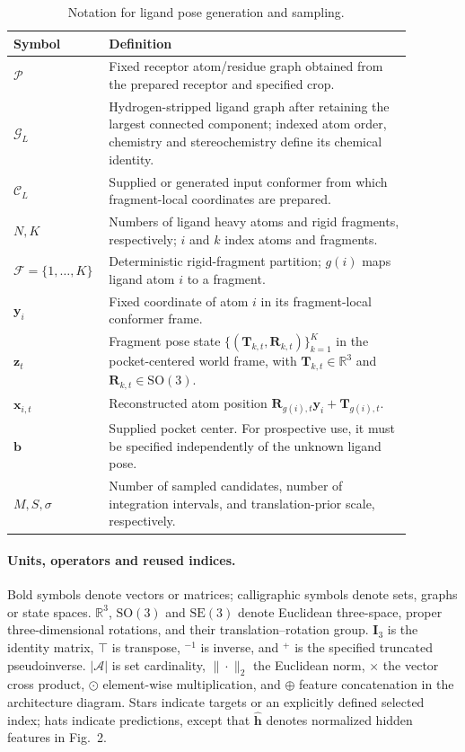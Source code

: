\documentclass{article}
\newcommand{\R}{\mathbb{R}}
\newcommand{\SO}{\mathrm{SO}}
\newcommand{\SE}{\mathrm{SE}}
\begin{document}
\begin{table}[htbp]
    \centering
    \small
    \caption{Notation for ligand pose generation and sampling.}
    \label{tab:si_notation}
    \begin{tabular}{p{0.16\linewidth}p{0.72\linewidth}}
        \toprule
        Symbol & Definition \\
        \midrule
        $\mathcal{P}$ & Fixed receptor atom/residue graph obtained from the prepared receptor and specified crop. \\
        $\mathcal{G}_{L}$ & Hydrogen-stripped ligand graph after retaining the largest connected component; indexed atom order, chemistry and stereochemistry define its chemical identity. \\
        $\mathcal{C}_{L}$ & Supplied or generated input conformer from which fragment-local coordinates are prepared. \\
        $N,K$ & Numbers of ligand heavy atoms and rigid fragments, respectively; $i$ and $k$ index atoms and fragments. \\
        $\mathcal{F}=\{1,\ldots,K\}$ & Deterministic rigid-fragment partition; $g(i)$ maps ligand atom $i$ to a fragment. \\
        $\mathbf{y}_i$ & Fixed coordinate of atom $i$ in its fragment-local conformer frame. \\
        $\mathbf{z}_t$ & Fragment pose state $\{(\mathbf{T}_{k,t},\mathbf{R}_{k,t})\}_{k=1}^{K}$ in the pocket-centered world frame, with $\mathbf{T}_{k,t}\in\R^3$ and $\mathbf{R}_{k,t}\in\SO(3)$. \\
        $\mathbf{x}_{i,t}$ & Reconstructed atom position $\mathbf{R}_{g(i),t}\mathbf{y}_i+\mathbf{T}_{g(i),t}$. \\
        $\mathbf{b}$ & Supplied pocket center. For prospective use, it must be specified independently of the unknown ligand pose. \\
        $M,S,\sigma$ & Number of sampled candidates, number of integration intervals, and translation-prior scale, respectively. \\
        \bottomrule
    \end{tabular}
\end{table}

\paragraph{Units, operators and reused indices.}
Bold symbols denote vectors or matrices; calligraphic symbols denote sets, graphs or state spaces. \(\R^3\), \(\SO(3)\) and \(\SE(3)\) denote Euclidean three-space, proper three-dimensional rotations, and their translation--rotation group. \(\mathbf I_3\) is the identity matrix, \(\top\) is transpose, \(^{-1}\) is inverse, and \(^{+}\) is the specified truncated pseudoinverse. \(|\mathcal A|\) is set cardinality, \(\|\cdot\|_2\) the Euclidean norm, \(\times\) the vector cross product, \(\odot\) element-wise multiplication, and \(\oplus\) feature concatenation in the architecture diagram. Stars indicate targets or an explicitly defined selected index; hats indicate predictions, except that \(\widehat{\mathbf h}\) denotes normalized hidden features in Fig.~2.
\end{document}
